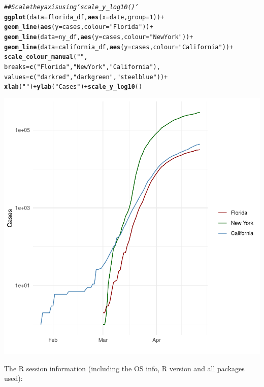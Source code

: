 \documentclass{article}\usepackage[]{graphicx}\usepackage[]{color}
\makeatletter
\newcommand{\hlnum}[1]{\textcolor[rgb]{0.686,0.059,0.569}{#1}}%
\newcommand{\hlstr}[1]{\textcolor[rgb]{0.192,0.494,0.8}{#1}}%
\newcommand{\hlcom}[1]{\textcolor[rgb]{0.678,0.584,0.686}{\textit{#1}}}%
\newcommand{\hlopt}[1]{\textcolor[rgb]{0,0,0}{#1}}%
\newcommand{\hlstd}[1]{\textcolor[rgb]{0.345,0.345,0.345}{#1}}%
\newcommand{\hlkwc}[1]{\textcolor[rgb]{0.333,0.667,0.333}{#1}}%
\newcommand{\hlkwd}[1]{\textcolor[rgb]{0.737,0.353,0.396}{\textbf{#1}}}%
\newenvironment{kframe}{%
 \def\at@end@of@kframe{}%
 \ifinner\ifhmode%
  \def\at@end@of@kframe{\end{minipage}}%
  \begin{minipage}{\columnwidth}%
 \fi\fi%
 \def\FrameCommand##1{\hskip\@totalleftmargin \hskip-\fboxsep
 \colorbox{shadecolor}{##1}\hskip-\fboxsep
     \hskip-\linewidth \hskip-\@totalleftmargin \hskip\columnwidth}%
 \MakeFramed {\advance\hsize-\width
   \@totalleftmargin\z@ \linewidth\hsize
   \@setminipage}}%
 {\par\unskip\endMakeFramed%
 \at@end@of@kframe}
\newenvironment{knitrout}{}{} %
\makeatother
\begin{document}
\begin{knitrout}
\begin{kframe}\begin{alltt}
\hlcom{## Scale the y axis using `scale_y_log10()`}
\hlkwd{ggplot}\hlstd{(}\hlkwc{data}\hlstd{=florida_df,} \hlkwd{aes}\hlstd{(}\hlkwc{x}\hlstd{=date,} \hlkwc{group}\hlstd{=}\hlnum{1}\hlstd{))} \hlopt{+}
  \hlkwd{geom_line}\hlstd{(}\hlkwd{aes}\hlstd{(}\hlkwc{y} \hlstd{= cases,} \hlkwc{colour} \hlstd{=} \hlstr{"Florida"}\hlstd{))} \hlopt{+}
  \hlkwd{geom_line}\hlstd{(}\hlkwc{data}\hlstd{=ny_df,} \hlkwd{aes}\hlstd{(}\hlkwc{y} \hlstd{= cases,}\hlkwc{colour}\hlstd{=}\hlstr{"New York"}\hlstd{))} \hlopt{+}
  \hlkwd{geom_line}\hlstd{(}\hlkwc{data}\hlstd{=california_df,} \hlkwd{aes}\hlstd{(}\hlkwc{y} \hlstd{= cases,} \hlkwc{colour}\hlstd{=}\hlstr{"California"}\hlstd{))} \hlopt{+}
  \hlkwd{scale_colour_manual}\hlstd{(}\hlstr{""}\hlstd{,}
                      \hlkwc{breaks} \hlstd{=} \hlkwd{c}\hlstd{(}\hlstr{"Florida"}\hlstd{,} \hlstr{"New York"}\hlstd{,} \hlstr{"California"}\hlstd{),}
                      \hlkwc{values} \hlstd{=} \hlkwd{c}\hlstd{(}\hlstr{"darkred"}\hlstd{,} \hlstr{"darkgreen"}\hlstd{,} \hlstr{"steelblue"}\hlstd{))} \hlopt{+}
  \hlkwd{xlab}\hlstd{(}\hlstr{" "}\hlstd{)} \hlopt{+} \hlkwd{ylab}\hlstd{(}\hlstr{"Cases"}\hlstd{)} \hlopt{+} \hlkwd{scale_y_log10}\hlstd{()}
\end{alltt}
\end{kframe}

{\centering \includegraphics[width=.6\linewidth]{figure/assignment-04-WilsonStewart-Rnwauto-report-10} 

}


\end{knitrout}

The R session information (including the OS info, R version and all
packages used):
\end{document}

